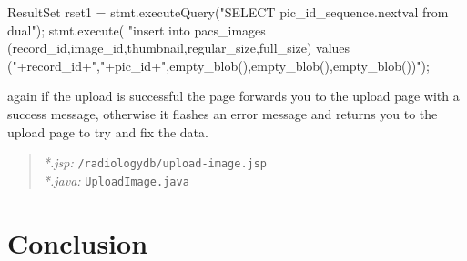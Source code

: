 \documentclass[11pt]{report}
\begin{document}
	    ResultSet rset1 = stmt.executeQuery("SELECT pic_id_sequence.nextval from dual");
	    stmt.execute( "insert into pacs_images (record_id,image_id,thumbnail,regular_size,full_size) values ("+record_id+","+pic_id+",empty_blob(),empty_blob(),empty_blob())");

again if the upload is successful the page forwards you to the upload page with a success message, otherwise it flashes an error message and returns you to the upload page to try and fix the data.

\begin{quote}
\emph{*.jsp:} \texttt{/radiologydb/upload-image.jsp} \\
\emph{*.java: } \texttt{UploadImage.java}
\end{quote}

\section*{Conclusion}
\end{document}
